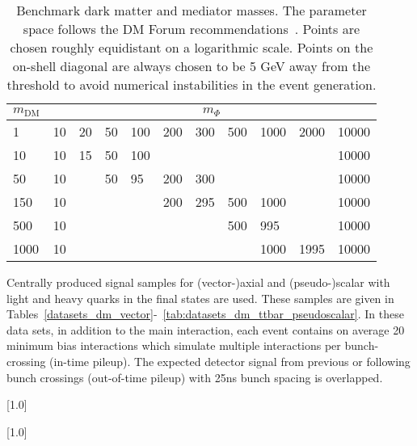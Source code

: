 \begin{table}[h!] \centering \begin{tabular}{l|llllllllll}\hline \hline
$m_\textrm{DM}$  & \multicolumn{10}{c}{$m_\Phi$}
\\ \hline 1    & 10 & 20 & 50 & 100 & 200 & 300 & 500 & 1000 & 2000 & 10000 \\
10   & 10 & 15 & 50 & 100 &     &     &     &      &      & 10000 \\ 50   & 10 &
& 50 & 95  & 200 & 300 &     &      &      & 10000 \\ 150  & 10 &    &    &
& 200 & 295 & 500 & 1000 &      & 10000 \\ 500  & 10 &    &    &     &     &
& 500 & 995  &      & 10000 \\ 1000 & 10 &    &    &     &     &     &     &
1000 & 1995 & 10000\\ \hline \hline \end{tabular} \caption{Benchmark dark
matter and mediator masses. The parameter space follows the
DM Forum recommendations~\cite{Abercrombie:2015wmb}. Points are chosen roughly
equidistant on a logarithmic scale. Points on the on-shell diagonal are always 
chosen to be 5 GeV away from the threshold to avoid numerical instabilities in 
the event generation.} \label{tab:DMgrid} \end{table}


\dub

Centrally produced signal samples for (vector-)axial and (pseudo-)scalar with light and heavy quarks in the final states are used.
These samples are given in Tables~\ref{datasets_dm_vector}-~\ref{tab:datasets_dm_ttbar_pseudoscalar}. In these data sets, in addition to the main interaction, each
event contains on average 20 minimum bias interactions which simulate
multiple interactions per bunch-crossing (in-time pileup). The expected
detector signal from previous or following bunch crossings (out-of-time
pileup) with 25ns bunch spacing is overlapped.

\begin{table}[!p]
 \centering
{}
 \scriptsize
 \scalebox{.7}[1.0]{}
\label{datasets_dm_vector}
\end{table}

\begin{table}[!p]
 \centering
{}
 \tiny
 \scalebox{.7}[1.0]{}
\label{datasets_dm_axial}
\end{table}

